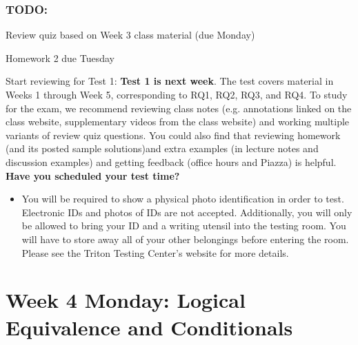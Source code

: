 \vfill


\subsubsection*{TODO:}
\begin{list}
   {\itemsep2pt}
    \item Review quiz based on Week 3 class material (due Monday)
    \item Homework 2 due Tuesday
   \item Start reviewing for Test 1: {\bf Test 1 is next week}. The test covers material in Weeks 1 through Week 5, corresponding to RQ1, RQ2, RQ3, and RQ4. To study for the exam, we recommend reviewing class notes (e.g. annotations linked on the class website, supplementary videos from the class website) and working multiple variants of review quiz questions. You could also find that reviewing homework (and its posted sample solutions)and extra examples (in lecture notes and discussion examples) and getting feedback (office hours and Piazza) is helpful. {\bf Have you scheduled your test time?} 
    \begin{itemize}
    \item You will be required to show a physical photo identification in order
to test. Electronic IDs and photos of IDs are not accepted. Additionally, you will only be allowed
to bring your ID and a writing utensil into the testing room. You will have to store away all of
your other belongings before entering the room. Please see the Triton Testing Center’s website
for more details.
    \end{itemize}
\end{list}

\newpage

\section*{Week 4 Monday: Logical Equivalence and Conditionals}
%



\vfill


\newpage

\newpage

\newpage


